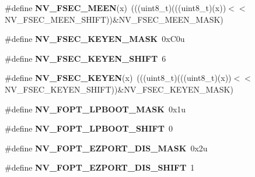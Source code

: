 \begin{DoxyCompactItemize}
\item 
\#define {\bfseries N\+V\+\_\+\+F\+S\+E\+C\+\_\+\+M\+E\+EN}(x)~(((uint8\+\_\+t)(((uint8\+\_\+t)(x))$<$$<$N\+V\+\_\+\+F\+S\+E\+C\+\_\+\+M\+E\+E\+N\+\_\+\+S\+H\+I\+FT))\&N\+V\+\_\+\+F\+S\+E\+C\+\_\+\+M\+E\+E\+N\+\_\+\+M\+A\+SK)\hypertarget{group__NV__Register__Masks_ga6a3e909b41d8dd2ca5f55b10e8cc4e52}{}\label{group__NV__Register__Masks_ga6a3e909b41d8dd2ca5f55b10e8cc4e52}

\item 
\#define {\bfseries N\+V\+\_\+\+F\+S\+E\+C\+\_\+\+K\+E\+Y\+E\+N\+\_\+\+M\+A\+SK}~0x\+C0u\hypertarget{group__NV__Register__Masks_ga50a87e963eeaaf5fdb904e7bac9099af}{}\label{group__NV__Register__Masks_ga50a87e963eeaaf5fdb904e7bac9099af}

\item 
\#define {\bfseries N\+V\+\_\+\+F\+S\+E\+C\+\_\+\+K\+E\+Y\+E\+N\+\_\+\+S\+H\+I\+FT}~6\hypertarget{group__NV__Register__Masks_ga3df55e24a4dc42a19afc15b4a3137bae}{}\label{group__NV__Register__Masks_ga3df55e24a4dc42a19afc15b4a3137bae}

\item 
\#define {\bfseries N\+V\+\_\+\+F\+S\+E\+C\+\_\+\+K\+E\+Y\+EN}(x)~(((uint8\+\_\+t)(((uint8\+\_\+t)(x))$<$$<$N\+V\+\_\+\+F\+S\+E\+C\+\_\+\+K\+E\+Y\+E\+N\+\_\+\+S\+H\+I\+FT))\&N\+V\+\_\+\+F\+S\+E\+C\+\_\+\+K\+E\+Y\+E\+N\+\_\+\+M\+A\+SK)\hypertarget{group__NV__Register__Masks_gaca6379e60e0371d1d0c8493abe9db870}{}\label{group__NV__Register__Masks_gaca6379e60e0371d1d0c8493abe9db870}

\item 
\#define {\bfseries N\+V\+\_\+\+F\+O\+P\+T\+\_\+\+L\+P\+B\+O\+O\+T\+\_\+\+M\+A\+SK}~0x1u\hypertarget{group__NV__Register__Masks_gabe7cb388b4a9f41cc264e7df5ecdf883}{}\label{group__NV__Register__Masks_gabe7cb388b4a9f41cc264e7df5ecdf883}

\item 
\#define {\bfseries N\+V\+\_\+\+F\+O\+P\+T\+\_\+\+L\+P\+B\+O\+O\+T\+\_\+\+S\+H\+I\+FT}~0\hypertarget{group__NV__Register__Masks_ga2fc27fe10cf14eb30613e131fe7e758e}{}\label{group__NV__Register__Masks_ga2fc27fe10cf14eb30613e131fe7e758e}

\item 
\#define {\bfseries N\+V\+\_\+\+F\+O\+P\+T\+\_\+\+E\+Z\+P\+O\+R\+T\+\_\+\+D\+I\+S\+\_\+\+M\+A\+SK}~0x2u\hypertarget{group__NV__Register__Masks_ga5c130a6f11de9f04a77b36fd61843e8f}{}\label{group__NV__Register__Masks_ga5c130a6f11de9f04a77b36fd61843e8f}

\item 
\#define {\bfseries N\+V\+\_\+\+F\+O\+P\+T\+\_\+\+E\+Z\+P\+O\+R\+T\+\_\+\+D\+I\+S\+\_\+\+S\+H\+I\+FT}~1\hypertarget{group__NV__Register__Masks_gabf1111ccacc4104b2855c4f3851cbaa5}{}\label{group__NV__Register__Masks_gabf1111ccacc4104b2855c4f3851cbaa5}


\end{DoxyCompactItemize}
